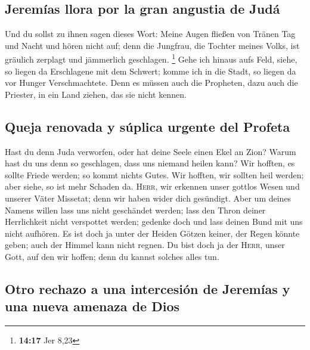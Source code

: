 \hypertarget{jeremuxedas-llora-por-la-gran-angustia-de-juduxe1}{%
\subsection{Jeremías llora por la gran angustia de
Judá}\label{jeremuxedas-llora-por-la-gran-angustia-de-juduxe1}}

 Und du sollst zu ihnen sagen dieses Wort: Meine Augen
fließen von Tränen Tag und Nacht und hören nicht auf; denn die Jungfrau,
die Tochter meines Volks, ist gräulich zerplagt und jämmerlich
geschlagen. \footnote{\textbf{14:17} Jer 8,23}  Gehe ich
hinaus aufs Feld, siehe, so liegen da Erschlagene mit dem Schwert; komme
ich in die Stadt, so liegen da vor Hunger Verschmachtete. Denn es müssen
auch die Propheten, dazu auch die Priester, in ein Land ziehen, das sie
nicht kennen.

\hypertarget{queja-renovada-y-suxfaplica-urgente-del-profeta}{%
\subsection{Queja renovada y súplica urgente del
Profeta}\label{queja-renovada-y-suxfaplica-urgente-del-profeta}}

 Hast du denn Juda verworfen, oder hat deine Seele einen
Ekel an Zion? Warum hast du uns denn so geschlagen, dass uns niemand
heilen kann? Wir hofften, es sollte Friede werden; so kommt nichts
Gutes. Wir hofften, wir sollten heil werden; aber siehe, so ist mehr
Schaden da.  \textsc{Herr}, wir erkennen unser gottlos
Wesen und unserer Väter Missetat; denn wir haben wider dich gesündigt.
 Aber um deines Namens willen lass uns nicht geschändet
werden; lass den Thron deiner Herrlichkeit nicht verspottet werden;
gedenke doch und lass deinen Bund mit uns nicht aufhören.
 Es ist doch ja unter der Heiden Götzen keiner, der Regen
könnte geben; auch der Himmel kann nicht regnen. Du bist doch ja der
\textsc{Herr}, unser Gott, auf den wir hoffen; denn du kannst solches
alles tun.

\hypertarget{otro-rechazo-a-una-intercesiuxf3n-de-jeremuxedas-y-una-nueva-amenaza-de-dios}{%
\subsection{Otro rechazo a una intercesión de Jeremías y una nueva
amenaza de
Dios}\label{otro-rechazo-a-una-intercesiuxf3n-de-jeremuxedas-y-una-nueva-amenaza-de-dios}}

